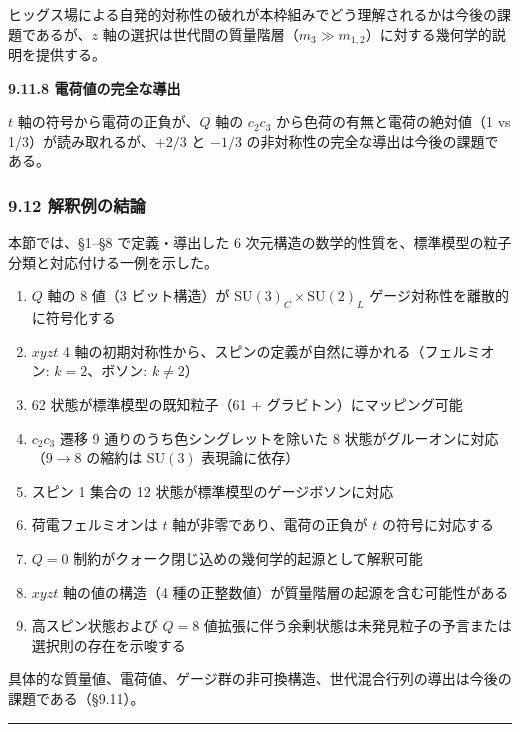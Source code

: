 \documentclass[
  a4paper,11pt]{ltjsarticle}
\providecommand{\tightlist}{%
  \setlength{\itemsep}{0pt}\setlength{\parskip}{0pt}}
\theoremstyle{definition}
\theoremstyle{remark}
\begin{document}
ヒッグス場による自発的対称性の破れが本枠組みでどう理解されるかは今後の課題であるが、\(z\)
軸の選択は世代間の質量階層（\(m_3 \gg m_{1,2}\)）に対する幾何学的説明を提供する。

\textbf{9.11.8 電荷値の完全な導出}

\(t\) 軸の符号から電荷の正負が、\(Q\) 軸の \(c_2 c_3\)
から色荷の有無と電荷の絶対値（1 vs 1/3）が読み取れるが、\(+2/3\) と
\(-1/3\) の非対称性の完全な導出は今後の課題である。

\subsubsection{9.12
解釈例の結論}\label{ux89e3ux91c8ux4f8bux306eux7d50ux8ad6}

本節では、§1--§8 で定義・導出した 6
次元構造の数学的性質を、標準模型の粒子分類と対応付ける一例を示した。

\begin{enumerate}
\def\labelenumi{\arabic{enumi}.}
\tightlist
\item
  \(Q\) 軸の 8 値（3 ビット構造）が
  \(\mathrm{SU}(3)_C \times \mathrm{SU}(2)_L\)
  ゲージ対称性を離散的に符号化する
\item
  \(xyzt\) 4
  軸の初期対称性から、スピンの定義が自然に導かれる（フェルミオン:
  \(k = 2\)、ボソン: \(k \neq 2\)）
\item
  62 状態が標準模型の既知粒子（61 + グラビトン）にマッピング可能
\item
  \(c_2 c_3\) 遷移 9 通りのうち色シングレットを除いた 8
  状態がグルーオンに対応（\(9 \to 8\) の縮約は \(\mathrm{SU}(3)\)
  表現論に依存）
\item
  スピン 1 集合の 12 状態が標準模型のゲージボソンに対応
\item
  荷電フェルミオンは \(t\) 軸が非零であり、電荷の正負が \(t\)
  の符号に対応する
\item
  \(Q = 0\) 制約がクォーク閉じ込めの幾何学的起源として解釈可能
\item
  \(xyzt\) 軸の値の構造（4
  種の正整数値）が質量階層の起源を含む可能性がある
\item
  高スピン状態および \(Q = 8\)
  値拡張に伴う余剰状態は未発見粒子の予言または選択則の存在を示唆する
\end{enumerate}

具体的な質量値、電荷値、ゲージ群の非可換構造、世代混合行列の導出は今後の課題である（§9.11）。

\begin{center}\rule{0.5\linewidth}{0.5pt}\end{center}
\end{document}
